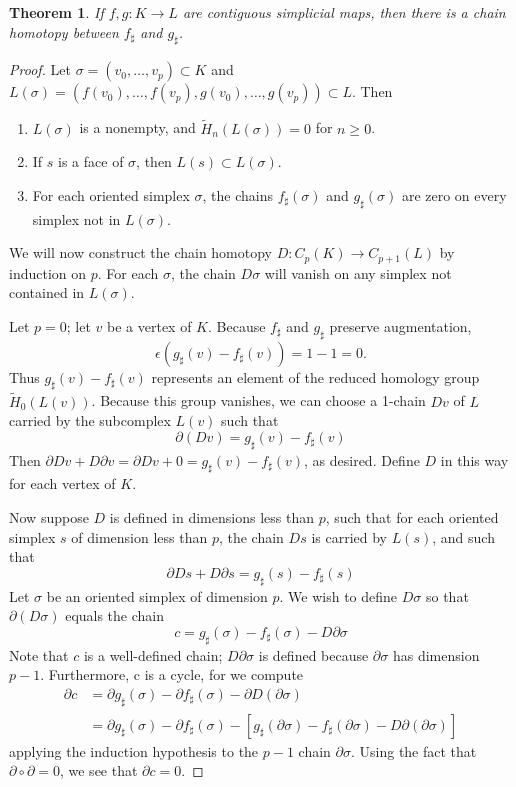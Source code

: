 \documentclass[draft,toc=bib]{scrartcl}
\theoremstyle{plain}
\newtheorem{theorem}{Theorem}[section]
\theoremstyle{definition}
\theoremstyle{remark}
\begin{document}
\begin{theorem}\label{contiguous->chain_hom}%
	If $f,g: K\to L$ are contiguous simplicial maps, then there is a chain homotopy between $f_\sharp$ and $g_\sharp$.
\end{theorem}%

\begin{proof}
	Let $\sigma=(v_0,\dots, v_p)\subset K$ and $L(\sigma)=(f(v_0),\dots,f(v_p),g(v_0),\dots,g(v_p))\subset L$. Then
	\begin{enumerate}
		\item $L(\sigma)$ is a nonempty, and $\tilde{H}_n(L(\sigma))=0 $ for $n\geq 0$. %
		\item If $s$ is a face of $\sigma$, then $L(s)\subset L(\sigma)$.
		\item For each oriented simplex $\sigma$, the chains $f_\sharp(\sigma)$ and $g_\sharp(\sigma)$ are zero on every simplex not in $L(\sigma)$.
	\end{enumerate}

We will now construct the chain homotopy $D: C_p(K)\to C_{p+1}(L)$ by induction on $p$. For each $\sigma$, the chain $D\sigma$ will vanish on any simplex not contained in $L(\sigma)$.

Let $p=0$; let $v$ be a vertex of $K$. Because $f_\sharp$ and $g_\sharp$ preserve augmentation, \[
\epsilon(g_\sharp(v)-f_\sharp(v))=1-1=0.
\]
Thus $g_\sharp(v)-f_\sharp(v)$ represents an element of the reduced homology group $\tilde{H}_0(L(v))$. %
Because this group vanishes, we can choose a 1-chain $Dv$ of $L$ carried by the subcomplex $L(v)$ such that
\[
\partial(Dv)=g_\sharp(v)-f_\sharp(v)
\]
Then $\partial Dv+D\partial v=\partial Dv+0=g_\sharp(v)-f_\sharp(v)$, as desired. Define $D$ in this way for each vertex of $K$.

Now suppose $D$ is defined in dimensions less than $p$, such that for each oriented simplex $s$ of dimension less than $p$, the chain $Ds$ is carried by $L(s)$, and such that 
\[
\partial Ds+D\partial s=g_\sharp(s)-f_\sharp(s)
\]
Let $\sigma$ be an oriented simplex of dimension $p$. We wish to define $D\sigma$ so that $\partial (D\sigma)$ equals the chain
\[
c=g_\sharp(\sigma)-f_\sharp(\sigma)-D\partial\sigma
\]
Note that $c$ is a well-defined chain; $D\partial\sigma$ is defined because $\partial \sigma$ has dimension $p-1$. Furthermore, c is a cycle, for we compute
\begin{align*}
	\partial c&=\partial g_\sharp(\sigma)-\partial f_\sharp(\sigma)-\partial D(\partial \sigma)\\
	&=\partial g_\sharp(\sigma)-\partial f_\sharp(\sigma)-[g_\sharp(\partial\sigma)-f_\sharp(\partial\sigma)-D\partial(\partial\sigma)]
\end{align*}
applying the induction hypothesis to the $p-1$ chain $\partial\sigma$. Using the fact that $\partial\circ \partial=0$, we see that $\partial c=0$.


\end{proof}
\end{document}
